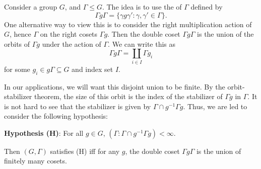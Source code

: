 \documentclass[a4paper]{article}
\begin{document}
%
%
%
Consider a group $G$, and $\Gamma \leq G$. The idea is to use the  of $\Gamma$ defined by
\[
  \Gamma g \Gamma = \{\gamma g \gamma' : \gamma, \gamma' \in \Gamma\}.
\]
One alternative way to view this is to consider the right multiplication action of $G$, hence $\Gamma$ on the right cosets $\Gamma g$. Then the double coset $\Gamma g \Gamma$ is the union of the orbits of $\Gamma g$ under the action of $\Gamma$. We can write this as
\[
  \Gamma g \Gamma = \coprod_{i \in I} \Gamma g_i
\]
for some $g_i \in g\Gamma \subseteq G$ and index set $I$.

In our applications, we will want this disjoint union to be finite. By the orbit-stabilizer theorem, the size of this orbit is the index of the stabilizer of $\Gamma g$ in $\Gamma$. It is not hard to see that the stabilizer is given by $\Gamma \cap g^{-1} \Gamma g$. Thus, we are led to consider the following hypothesis:
\begin{center}
  \textbf{Hypothesis (H)}: For all $g \in G$, $(\Gamma: \Gamma \cap g^{-1} \Gamma g) < \infty$.
\end{center}
Then $(G, \Gamma)$ satisfies (H) iff for any $g$, the double coset $\Gamma g \Gamma$ is the union of finitely many cosets.
\end{document}
